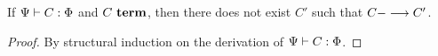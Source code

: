 \begin{lemma}
If $\Psi |- C : \Phi$ and $C~\textbf{term}$, then there does not exist
$C'$ such that $C ---> C'$.
\begin{proof}
    By structural induction on the derivation of $\Psi |- C : \Phi$.
\end{proof}
\end{lemma}

